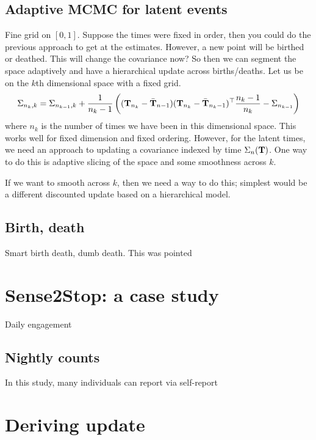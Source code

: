 \documentclass[11pt]{amsart}
\def\bfT{{\bf T}}
\begin{document}
\subsection{Adaptive MCMC for latent events}

Fine grid on $[0,1]$.  Suppose the times were fixed in order, then you could do the previous approach to get at the estimates.  However, a new point will be birthed or deathed.  This will change the covariance now? So then we can segment the space adaptively and have a hierarchical update across births/deaths.  Let us be on the $k$th dimensional space with a fixed grid.
$$
\Sigma_{n_k,k} = \Sigma_{n_{k-1},k}  + \frac{1}{n_k-1} \left( (\bfT_{n_k} - \bar \bfT_{n-1}) (\bfT_{n_k} - \bar \bfT_{n_k-1})^\top \frac{n_k-1}{n_k} - \Sigma_{n_{k-1}} \right)
$$
where $n_k$ is the number of times we have been in this dimensional space.
This works well for fixed dimension and fixed ordering.  However, for the latent times, we need an approach to updating a covariance indexed by time $\Sigma_{n} (\bf T)$.  One way to do this is adaptive slicing of the space and some smoothness across $k$.

If we want to smooth across $k$, then we need a way to do this; simplest would be a different discounted update based on a hierarchical model.


\subsection{Birth, death}

Smart birth death, dumb death.  This was pointed

\section{Sense2Stop: a case study}

Daily engagement

\subsection{Nightly counts}

In this study, many individuals can report via self-report



\appendix

\section{Deriving update}
\end{document}
